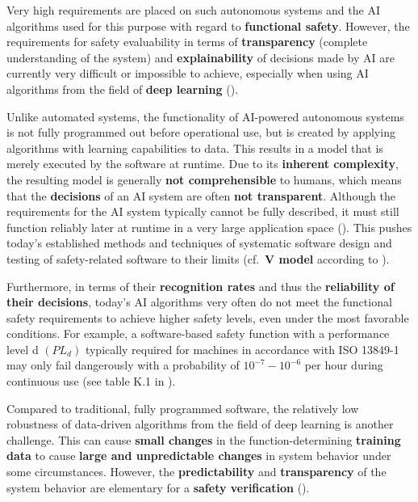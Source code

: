 \documentclass [oneside,10pt,a4paper,ngerman,BCOR10mm,headsepline,parindent,final]{scrartcl}
\begin{document}
Very high requirements are placed on such autonomous systems and the AI
algorithms used for this purpose with regard to \textbf{functional
safety}. However, the requirements for safety evaluability in terms of
\textbf{transparency} (complete understanding of the system) and
\textbf{explainability} of decisions made by AI are currently very
difficult or impossible to achieve, especially when using AI algorithms
from the field of \textbf{deep learning} (\cite{Liggesmeyer_2019}).

Unlike automated systems, the functionality of AI-powered autonomous
systems is not fully programmed out before operational use, but is
created by applying algorithms with learning capabilities to data. This
results in a model that is merely executed by the software at runtime.
Due to its \textbf{inherent complexity}, the resulting model is
generally \textbf{not comprehensible} to humans, which means that the
\textbf{decisions} of an AI system are often \textbf{not transparent}.
Although the requirements for the AI system typically cannot be fully
described, it must still function reliably later at runtime in a very
large application space (\cite{Schneider_2021}). This pushes today's
established methods and techniques of systematic software design and
testing of safety-related software to their limits (cf.~\textbf{V model}
according to \cite{DIN_EN_61508-3_2011-02}).

Furthermore, in terms of their \textbf{recognition rates} and thus the
\textbf{reliability of their decisions}, today's AI algorithms very
often do not meet the functional safety requirements to achieve higher
safety levels, even under the most favorable conditions. For example, a
software-based safety function with a performance level d \((PL_{d})\)
typically required for machines in accordance with ISO 13849-1 may only
fail dangerously with a probability of \(10^{-7} - 10^{-6}\) per hour
during continuous use (see table K.1 in \cite{DIN_EN_ISO_13849-1_2016}).

Compared to traditional, fully programmed software, the relatively low
robustness of data-driven algorithms from the field of deep learning is
another challenge. This can cause \textbf{small changes} in the
function-determining \textbf{training data} to cause \textbf{large and
unpredictable changes} in system behavior under some circumstances.
However, the \textbf{predictability} and \textbf{transparency} of the
system behavior are elementary for a \textbf{safety verification}
(\cite{BAuA_Rechtsgutachten_KI_2021}).
\end{document}
